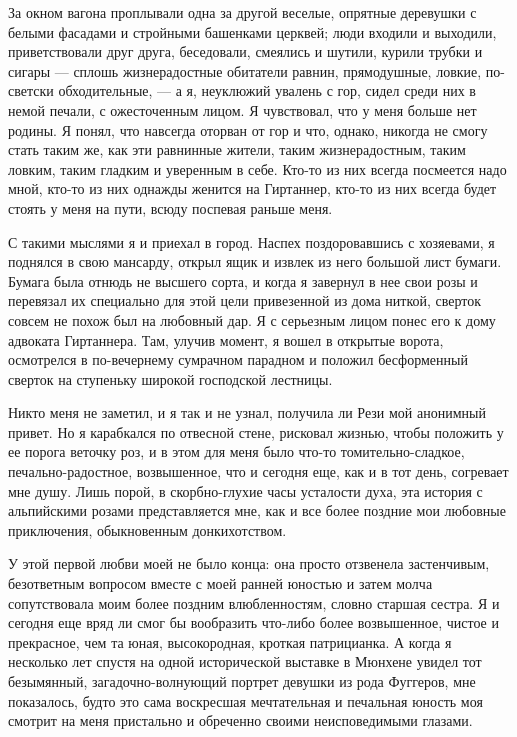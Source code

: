 За окном вагона проплывали одна  за другой веселые, опрятные деревушки
с  белыми  фасадами и  стройными  башенками  церквей; люди  входили  и
выходили, приветствовали  друг друга,  беседовали, смеялись  и шутили,
курили  трубки и  сигары ---  сплошь жизнерадостные  обитатели равнин,
прямодушные,  ловкие, по-светски  обходительные,  ---  а я,  неуклюжий
увалень с гор, сидел среди них в немой печали, с ожесточенным лицом. Я
чувствовал,  что у  меня  больше  нет родины.  Я  понял, что  навсегда
оторван от гор и что, однако, никогда не смогу стать таким же, как эти
равнинные жители, таким жизнерадостным,  таким ловким, таким гладким и
уверенным в себе. Кто-то из них  всегда посмеется надо мной, кто-то из
них однажды женится на Гиртаннер, кто-то  из них всегда будет стоять у
меня на пути, всюду поспевая раньше меня.

С  такими  мыслями  я  и  приехал в  город.  Наспех  поздоровавшись  с
хозяевами, я  поднялся в свою мансарду,  открыл ящик и извлек  из него
большой лист  бумаги. Бумага была отнюдь  не высшего сорта, и  когда я
завернул  в нее  свои розы  и перевязал  их специально  для этой  цели
привезенной из  дома ниткой, сверток  совсем не похож был  на любовный
дар. Я  с серьезным лицом понес  его к дому адвоката  Гиртаннера. Там,
улучив момент,  я вошел в  открытые ворота, осмотрелся  в по-вечернему
сумрачном парадном и положил бесформенный сверток на ступеньку широкой
господской лестницы.

Никто  меня не  заметил, и  я так  и не  узнал, получила  ли Рези  мой
анонимный привет. Но я карабкался  по отвесной стене, рисковал жизнью,
чтобы  положить у  ее  порога веточку  роз,  и в  этом  для меня  было
что-то  томительно-сладкое,  печально-радостное,  возвышенное,  что  и
сегодня  еще, как  и в  тот день,  согревает мне  душу. Лишь  порой, в
скорбно-глухие часы  усталости духа, эта история  с альпийскими розами
представляется мне, как и все  более поздние мои любовные приключения,
обыкновенным донкихотством.

У  этой  первой  любви  моей  не  было  конца:  она  просто  отзвенела
застенчивым, безответным вопросом вместе с моей ранней юностью и затем
молча сопутствовала  моим более поздним влюбленностям,  словно старшая
сестра. Я  и сегодня  еще вряд  ли смог  бы вообразить  что-либо более
возвышенное, чистое  и прекрасное, чем та  юная, высокородная, кроткая
патрицианка.  А когда  я несколько  лет спустя  на одной  исторической
выставке в Мюнхене увидел  тот безымянный, загадочно-волнующий портрет
девушки из  рода Фуггеров, мне  показалось, будто это  сама воскресшая
мечтательная  и печальная  юность  моя смотрит  на  меня пристально  и
обреченно своими неисповедимыми глазами.

